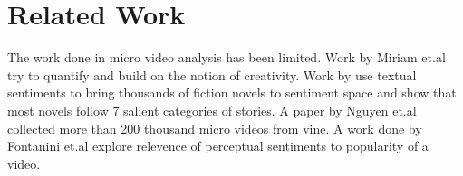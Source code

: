 \section{ Related Work}
The work done in micro video analysis has been limited. Work by Miriam et.al \cite{redi20146} try to quantify and build on the notion of creativity. Work by \cite{reagan2016emotional} use textual sentiments to bring thousands of fiction novels to sentiment space and show that most novels follow 7 salient categories of stories. 
A paper by Nguyen et.al \cite{nguyen2016open} collected more than 200 thousand micro videos from vine. 
A work done by Fontanini et.al \cite{fontanini2016web} explore relevence of perceptual sentiments to popularity of a video. 
